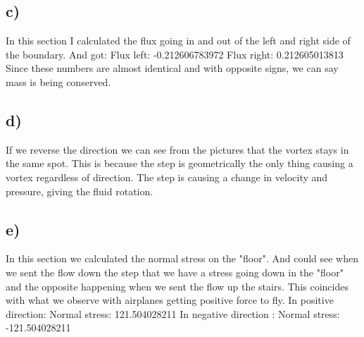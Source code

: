 \documentclass[a4paper,norsk]{article}
\begin{document}
\subsection*{c)}
In this section I calculated the flux going in and out of the left and right side of the boundary. And got: \newline
Flux left:  -0.212606783972 \newline
Flux right:  0.212605013813 \newline
\newline
Since these numbers are almost identical and with opposite signs, we can say mass is being conserved.

\subsection*{d)}
If we reverse the direction we can see from the pictures that the vortex stays in the same spot. This is because the step is geometrically the only thing causing a vortex regardless of direction. The step is causing a change in velocity and pressure, giving the fluid rotation.

\subsection*{e)}
In this section we calculated the normal stress on the "floor". And could see when we sent the flow down the step that we have a stress going down in the "floor" and the opposite happening when we sent the flow up the stairs. This coincides with what we observe with airplanes getting positive force to fly.
\newline
In positive direction: \newline
Normal stress:  121.504028211 \newline
In negative direction : \newline
Normal stress:  -121.504028211
\end{document}
